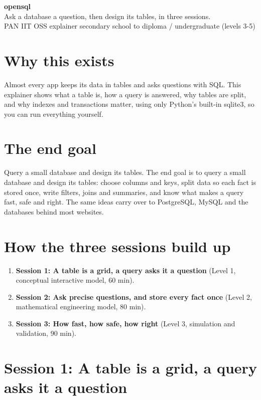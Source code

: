 \documentclass[11pt,a4paper]{article}
\begin{document}
\begin{center}{\LARGE\bfseries opensql}\\[0.4em]{\large Ask a database a question, then design its tables, in three sessions.}\\[0.2em]\small PAN IIT OSS explainer \textbullet{} secondary school to diploma / undergraduate (levels 3-5)\end{center}

\section*{Why this exists}
Almost every app keeps its data in tables and asks questions with SQL. This explainer shows what a table is, how a query is answered, why tables are split, and why indexes and transactions matter, using only Python's built-in sqlite3, so you can run everything yourself.

\section*{The end goal}
Query a small database and design its tables. The end goal is to query a small database and design its tables: choose columns and keys, split data so each fact is stored once, write filters, joins and summaries, and know what makes a query fast, safe and right. The same ideas carry over to PostgreSQL, MySQL and the databases behind most websites.

\section*{How the three sessions build up}
\begin{enumerate}[nosep]
\item \textbf{Session 1: A table is a grid, a query asks it a question} (Level 1, conceptual interactive model, 60 min).
\item \textbf{Session 2: Ask precise questions, and store every fact once} (Level 2, mathematical engineering model, 80 min).
\item \textbf{Session 3: How fast, how safe, how right} (Level 3, simulation and validation, 90 min).
\end{enumerate}

\section{Session 1: A table is a grid, a query asks it a question}
\end{document}
